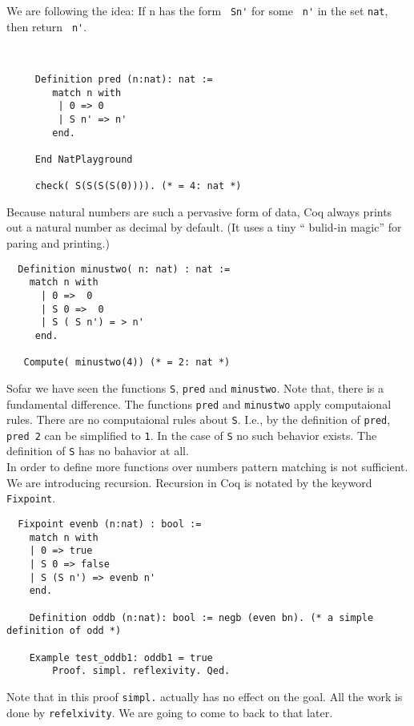   We are following the idea:  If n has the form \lstinline! Sn'! for some \lstinline! n'! in the set \lstinline!nat!, then return  \lstinline! n'!.
  \begin{example}~\\\vspace{-10mm}
   \begin{lstlisting}
  	 Definition pred (n:nat): nat :=
   		match n with 
   	     | 0 => 0
   	     | S n' => n'
   	    end. 
   	  
   	 End NatPlayground
   	 
   	 check( S(S(S(S(0)))). (* = 4: nat *)
   \end{lstlisting}
  \end{example}
  Because natural numbers are such a pervasive form of data, Coq always prints out a natural number as decimal by default.
  (It uses a tiny `` bulid-in magic'' for paring and printing.)
 
  \begin{lstlisting}
  Definition minustwo( n: nat) : nat :=
    match n with
      | 0 =>  0
      | S 0 =>  0
      | S ( S n') = > n'
     end.
     
   Compute( minustwo(4)) (* = 2: nat *)
  \end{lstlisting}  
  Sofar we have seen the functions \lstinline!S!, \lstinline!pred! and \lstinline!minustwo!.
  Note that, there is a fundamental difference.
  The functions \lstinline!pred! and \lstinline!minustwo! apply computaional rules. 
  There are no computaional rules about \lstinline!S!.
  I.e., by the definition of \lstinline!pred!, \lstinline!pred 2! can be simplified to \lstinline!1!. 
  In the case of \lstinline!S! no such behavior exists.
  The definition of \lstinline!S! has no bahavior at all.\\ 
    
  In order to define more functions over numbers pattern matching is not sufficient. We are introducing recursion.
  Recursion in Coq is notated by the keyword \lstinline!Fixpoint!.
  
  \begin{lstlisting}
  Fixpoint evenb (n:nat) : bool :=
  	match n with
  	| 0 => true
  	| S 0 => false
  	| S (S n') => evenb n'
  	end.
  	
  	Definition oddb (n:nat): bool := negb (even bn). (* a simple definition of odd *)
  	
  	Example test_oddb1: oddb1 = true
    	Proof. simpl. reflexivity. Qed.
  \end{lstlisting}
   Note that in this proof \lstinline!simpl.! actually has no effect on the goal. 
   All the work is done by \lstinline!refelxivity!. 
   We are going to come to back to that later.
   
